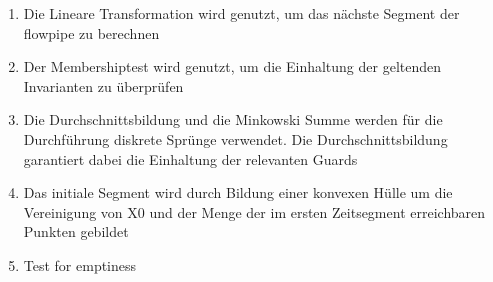 
\begin{enumerate}
\item Die Lineare Transformation wird genutzt, um das nächste Segment der flowpipe zu berechnen
\item Der Membershiptest wird genutzt, um die Einhaltung der geltenden Invarianten zu überprüfen
\item Die Durchschnittsbildung und die Minkowski Summe werden für die Durchführung diskrete Sprünge verwendet. Die Durchschnittsbildung garantiert dabei die Einhaltung der relevanten Guards
\item Das initiale Segment wird durch Bildung einer konvexen Hülle um die Vereinigung von X0 und der Menge der im ersten Zeitsegment erreichbaren Punkten gebildet
\item Test for emptiness
\end{enumerate}
